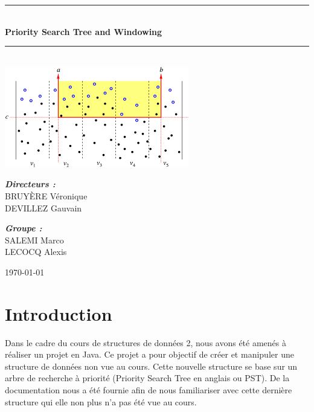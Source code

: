 \documentclass[10pt,a4paper]{article}
\newcommand{\HRule}{\rule{\linewidth}{0.5mm}}
\begin{document}
\begin{titlepage}
\begin{sffamily}
\begin{center}
    \HRule \\[0.4cm]
    { \huge \bfseries Priority Search Tree and Windowing\\[0.4cm] }

    \HRule \\[2cm]
    \includegraphics[scale=0.50]{images/window.png}
    \\[2cm]

    \begin{minipage}{0.4\textwidth}
      \begin{flushleft} \large
        \emph{\textbf{Directeurs :}}\\ BRUYÈRE Véronique \\ DEVILLEZ Gauvain \\
      \end{flushleft}
    \end{minipage}
    \begin{minipage}{0.4\textwidth}
      \begin{flushright} \large
        \emph{\textbf{Groupe :}}\\  SALEMI Marco \\  LECOCQ Alexis
      \end{flushright}
    \end{minipage}

    \vfill

    {\large \today}

  \end{center}
  \end{sffamily}
\end{titlepage}

\newpage
\tableofcontents
\newpage
\section{Introduction}
Dans le cadre du cours de structures de données 2, nous avons été amenés à réaliser un projet en Java. Ce projet a pour objectif de créer et manipuler une structure de données non vue au cours. Cette nouvelle structure se base sur un arbre de recherche à priorité (Priority Search Tree en anglais ou PST). De la documentation nous a été fournie afin de nous familiariser avec cette dernière structure qui elle non plus n'a pas été vue au cours.
\end{document}
